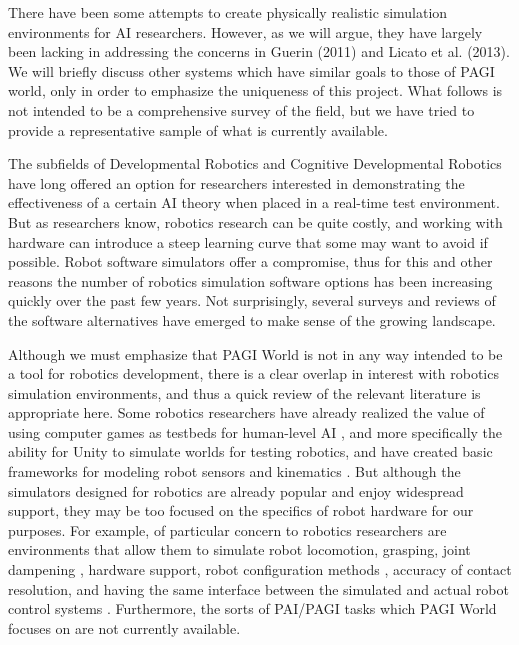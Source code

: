 There have been some attempts to create physically realistic simulation environments for AI researchers. However, as we will argue, they have largely been lacking in addressing the concerns in Guerin (2011) and Licato et al. (2013). We will briefly discuss other systems which have similar goals to those of PAGI world, only in order to emphasize the uniqueness of this project. What follows is not intended to be a comprehensive survey of the field, but we have tried to provide a representative sample of what is currently available.

The subfields of Developmental Robotics \cite{Lungarella2003} and Cognitive Developmental Robotics \cite{Asada2009} have long offered an option for researchers interested in demonstrating the effectiveness of a certain AI theory when placed in a real-time test environment. But as researchers know, robotics research can be quite costly, and working with hardware can introduce a steep learning curve that some may want to avoid if possible. Robot software simulators offer a compromise, thus for this and other reasons the number of robotics simulation software options has been increasing quickly over the past few years. Not surprisingly, several surveys and reviews of the software alternatives have emerged to make sense of the growing landscape.%

Although we must emphasize that PAGI World is not in any way intended to be a tool for robotics development, there is a clear overlap in interest with robotics simulation environments, and thus a quick review of the relevant literature is appropriate here. Some robotics researchers have already realized the value of using computer games as testbeds for human-level AI \cite{Laird2001}, and more specifically the ability for Unity to simulate worlds for testing robotics, and have created basic frameworks for modeling robot sensors and kinematics \cite{Hernandez-Belmonte2011,Mattingly2012}. But although the simulators designed for robotics are already popular and enjoy widespread support, they may be too focused on the specifics of robot hardware for our purposes. For example, of particular concern to robotics researchers are environments that allow them to simulate robot locomotion, grasping, joint dampening \cite{Drumwright2010}, hardware support, robot configuration methods \cite{Kramer2007}, accuracy of contact resolution, and having the same interface between the simulated and actual robot control systems \cite{Ivaldi2014}. Furthermore, the sorts of PAI/PAGI tasks which PAGI World focuses on are not currently available.

